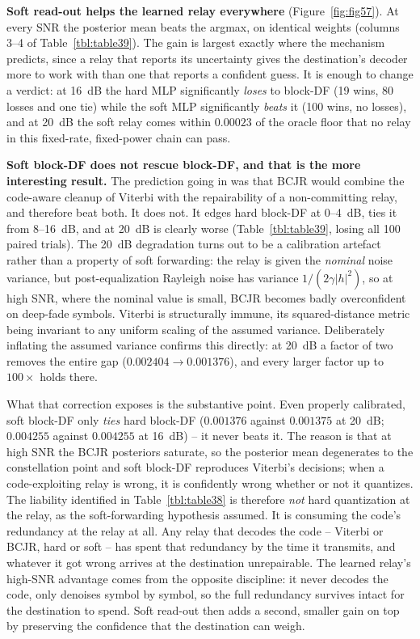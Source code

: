 \textbf{Soft read-out helps the learned relay everywhere} (Figure~\ref{fig:fig57}). At every SNR the posterior mean beats the argmax, on identical weights (columns 3--4 of Table~\ref{tbl:table39}). The gain is largest exactly where the mechanism predicts, since a relay that reports its uncertainty gives the destination's decoder more to work with than one that reports a confident guess. It is enough to change a verdict: at 16~dB the hard MLP significantly \emph{loses} to block-DF (19 wins, 80 losses and one tie) while the soft MLP significantly \emph{beats} it (100 wins, no losses), and at 20~dB the soft relay comes within $0.00023$ of the oracle floor that no relay in this fixed-rate, fixed-power chain can pass.

\textbf{Soft block-DF does not rescue block-DF, and that is the more interesting result.} The prediction going in was that BCJR would combine the code-aware cleanup of Viterbi with the repairability of a non-committing relay, and therefore beat both. It does not. It edges hard block-DF at 0--4~dB, ties it from 8--16~dB, and at 20~dB is clearly worse (Table~\ref{tbl:table39}, losing all 100 paired trials). The 20~dB degradation turns out to be a calibration artefact rather than a property of soft forwarding: the relay is given the \emph{nominal} noise variance, but post-equalization Rayleigh noise has variance $1/(2\gamma|h|^2)$, so at high SNR, where the nominal value is small, BCJR becomes badly overconfident on deep-fade symbols. Viterbi is structurally immune, its squared-distance metric being invariant to any uniform scaling of the assumed variance. Deliberately inflating the assumed variance confirms this directly: at 20~dB a factor of two removes the entire gap ($0.002404 \to 0.001376$), and every larger factor up to $100\times$ holds there.

What that correction exposes is the substantive point. Even properly calibrated, soft block-DF only \emph{ties} hard block-DF ($0.001376$ against $0.001375$ at 20~dB; $0.004255$ against $0.004255$ at 16~dB) -- it never beats it. The reason is that at high SNR the BCJR posteriors saturate, so the posterior mean degenerates to the constellation point and soft block-DF reproduces Viterbi's decisions; when a code-exploiting relay is wrong, it is confidently wrong whether or not it quantizes. The liability identified in Table~\ref{tbl:table38} is therefore \emph{not} hard quantization at the relay, as the soft-forwarding hypothesis assumed. It is consuming the code's redundancy at the relay at all. Any relay that decodes the code -- Viterbi or BCJR, hard or soft -- has spent that redundancy by the time it transmits, and whatever it got wrong arrives at the destination unrepairable. The learned relay's high-SNR advantage comes from the opposite discipline: it never decodes the code, only denoises symbol by symbol, so the full redundancy survives intact for the destination to spend. Soft read-out then adds a second, smaller gain on top by preserving the confidence that the destination can weigh.

